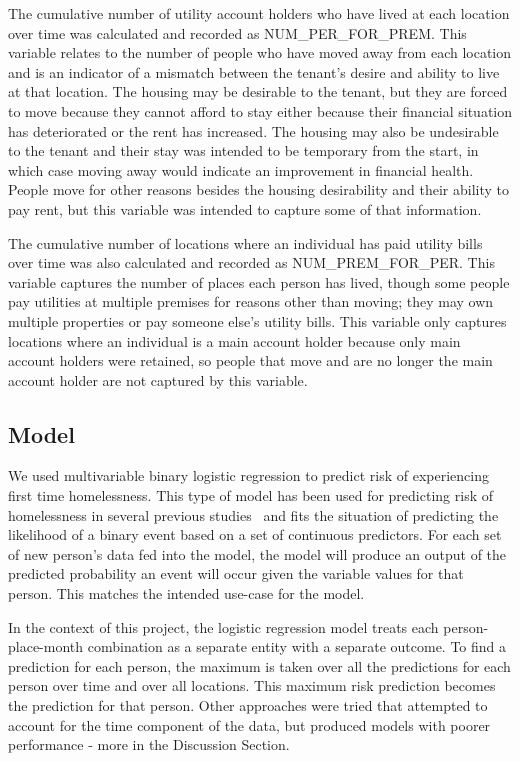 \documentclass[10pt,letterpaper]{article}
\begin{document}
The cumulative number of utility account holders who have lived at each location over time was calculated and recorded as NUM\_PER\_FOR\_PREM. This variable relates to the number of people who have moved away from each location and is an indicator of a mismatch between the tenant's desire and ability to live at that location. The housing may be desirable to the tenant, but they are forced to move because they cannot afford to stay either because their financial situation has deteriorated or the rent has increased. The housing may also be undesirable to the tenant and their stay was intended to be temporary from the start, in which case moving away would indicate an improvement in financial health. People move for other reasons besides the housing desirability and their ability to pay rent, but this variable was intended to capture some of that information.

The cumulative number of locations where an individual has paid utility bills over time was also calculated and recorded as NUM\_PREM\_FOR\_PER. This variable captures the number of places each person has lived, though some people pay utilities at multiple premises for reasons other than moving; they may own multiple properties or pay someone else's utility bills. This variable only captures locations where an individual is a main account holder because only main account holders were retained, so people that move and are no longer the main account holder are not captured by this variable.

\subsection*{Model}
We used multivariable binary logistic regression to predict risk of experiencing first time homelessness. This type of model has been used for predicting risk of homelessness in several previous studies~\cite{byrne2020classification,van2009longitudinal,flaming2011crisis, hong2018applications,toros2019early} and fits the situation of predicting the likelihood of a binary event based on a set of continuous predictors. For each set of new person's data fed into the model, the model will produce an output of the predicted probability an event will occur given the variable values for that person. This matches the intended use-case for the model. 

In the context of this project, the logistic regression model treats each person-place-month combination as a separate entity with a separate outcome. To find a prediction for each person, the maximum is taken over all the predictions for each person over time and over all locations. This maximum risk prediction becomes the prediction for that person. Other approaches were tried that attempted to account for the time component of the data, but produced models with poorer performance - more in the Discussion Section.
\end{document}
